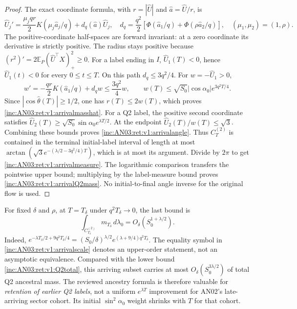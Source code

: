 \documentclass[11pt]{article}
\numberwithin{equation}{section}
\theoremstyle{remark}\newtheorem{remark}[theorem]{Remark}
\newcommand{\E}{\mathbb E}
\newcommand{\dd}{\,d}
\newcommand{\1}{\mathbf 1}
\begin{document}
\begin{proof}
The exact coordinate formula, with $r=|\widehat U|$ and
$\widehat a=\widehat U/r$, is
\begin{equation}\label{inc:AN03:ret:v1:coordinatefield}
 \widehat U_j'=\frac{\mu_jqr}{2}K(\mu_j\widehat a_j/q)
 +d_q(\widehat a)\widehat U_j,
 \quad
 d_q=\frac{q^2}{2}[\Phi(\widehat a_1/q)+\Phi(\rho\widehat a_2/q)],
 \quad (\mu_1,\mu_2)=(1,\rho).
\end{equation}
The positive-coordinate half-spaces are forward invariant: at a zero
coordinate its derivative is strictly positive. The radius stays
positive because $(r^2)'=2\E_P(\widehat U^\top X)_+^2\ge0$.
For a label ending in $I$, $\widehat U_1(T)<0$, hence
$\widehat U_1(t)<0$ for every $0\le t\le T$. On this path
$d_q\le3q^2/4$. For $w=-\widehat U_1>0$,
\[
 w'=-\frac{qr}{2}K(\widehat a_1/q)+d_qw
 \le\frac{3q^2}{4}w,
 \qquad w(T)\le\sqrt{S_0}|\cos\alpha_0|e^{3q^2T/4}.
\]
Since $|\cos\widehat\theta(T)|\ge1/2$, one has $r(T)\le2w(T)$,
which proves \eqref{inc:AN03:ret:v1:arrivalmasshat}.
For a Q2 label, the positive second coordinate satisfies
$\widehat U_2(T)\ge\sqrt{S_0}\sin\alpha_0 e^{\lambda T/2}$.
At the endpoint $\widehat U_2(T)/w(T)\le\sqrt3$.
Combining these bounds proves \eqref{inc:AN03:ret:v1:arrivalangle}.
Thus $C_T^{(2)}$ is contained in the terminal initial-label interval
of length at most
$\arctan(\sqrt3 e^{-(\lambda/2-3q^2/4)T})$, which is at most its
argument. Divide by $2\pi$ to get \eqref{inc:AN03:ret:v1:arrivalmeasure}.
The logarithmic comparison transfers the pointwise upper bound; multiplying
by the label-measure bound proves \eqref{inc:AN03:ret:v1:arrivalQ2mass}.
No initial-to-final angle inverse for the original flow is used.
\end{proof}

For fixed $\delta$ and $\rho$, at $T=T_\delta$ under
$q^2T_\delta\to0$, the last bound is
\begin{equation}\label{inc:AN03:ret:v1:arrivalscale}
 \int_{C_{T_\delta}^{(2)}}m_{T_\delta}\dd\lambda_0
 =O_\delta(S_0^{1+\lambda/2}).
\end{equation}
Indeed,
$e^{-\lambda T_\delta/2+9q^2T_\delta/4}
=(S_0/\delta)^{\lambda/2}
 e^{(\lambda+9/4)q^2T_\delta}$.
The equality symbol in \eqref{inc:AN03:ret:v1:arrivalscale} denotes an
upper-order statement, not an asymptotic equivalence. Compared with the
lower bound \eqref{inc:AN03:ret:v1:Q2total}, this arriving subset carries
at most $O_\delta(S_0^{3\lambda/2})$ of total Q2 ancestral mass.
The reviewed ancestry formula is therefore valuable for \emph{retention
of earlier Q2 labels}, not a uniform $e^{\lambda T}$ improvement for
AN02's late-arriving sector cohort. Its initial $\sin^2\alpha_0$ weight
shrinks with $T$ for that cohort.
\end{document}
